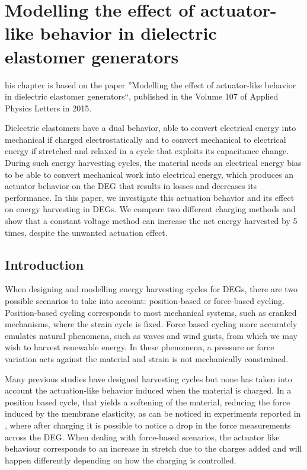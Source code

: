 %
%
\let\textcircled=\pgftextcircled
\chapter{Modelling the effect of actuator-like behavior in dielectric elastomer generators}
\label{chap:1}

his chapter is based on the paper ''Modelling the effect of actuator-like behavior in dielectric elastomer generators``, published in the Volume 107 of Applied Physics Letters in 2015.

Dielectric elastomers have a dual behavior, able to convert electrical energy into mechanical if charged electrostatically and to convert mechanical to electrical energy if stretched and relaxed in a cycle that exploits its capacitance change. During such energy harvesting cycles, the material needs an electrical energy bias to be able to convert mechanical work into electrical energy, which produces an actuator behavior on the DEG that results in losses and decreases its performance. In this paper, we investigate this actuation behavior and its effect on energy harvesting in DEGs. We compare two different charging methods and show that a constant voltage method can increase the net energy harvested by 5 times, despite the unwanted actuation effect.




\section{Introduction}
\label{sec:intro}

When designing and modelling energy harvesting cycles for DEGs, there are two possible scenarios to take into account: position-based or force-based cycling. Position-based cycling corresponds to most mechanical systems, such as cranked mechanisms, where the strain cycle is fixed. Force based cycling more accurately emulates natural phenomena, such as waves and wind gusts, from which we may wish to harvest renewable energy. In these phenomena, a pressure or force variation acts against the material and strain is not mechanically constrained. 

Many previous studies have designed harvesting cycles\cite{RN85,RN629,Shian2014OptimizingGenerators} but none has taken into account the actuation-like behavior induced when the material is charged. In a position based cycle, that yields a softening of the material, reducing the force induced by the membrane elasticity, as can be noticed in experiments reported in \cite{RN1}, where after charging it is possible to notice a drop in the force measurements across the DEG.
When dealing with force-based scenarios, the actuator like behaviour corresponds to an increase in stretch due to the charges added and will happen differently depending on how the charging is controlled.

